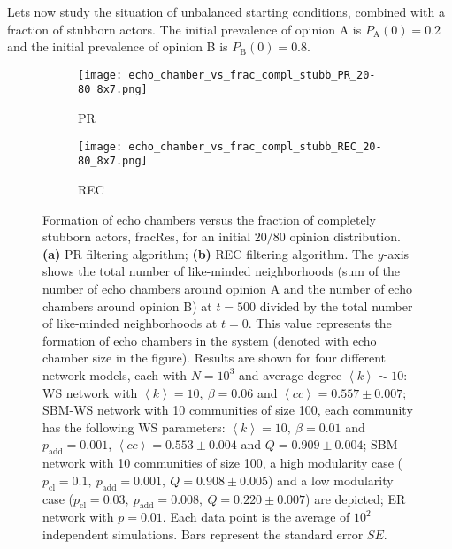 \documentclass[11 pt , letterpaper , twoside , openright]{book}
\begin{document}
\newline
Lets now study the situation of unbalanced starting conditions, combined with a fraction of stubborn actors. The initial prevalence of opinion A is $P_\text{A}(0) = 0.2$ and the initial prevalence of opinion B is $P_\text{B}(0) = 0.8$.

\begin{figure}[H]
  \begin{subfigure}[b]{0.49\textwidth}
    \caption{PR}
  	\texttt{[image: echo\_chamber\_vs\_frac\_compl\_stubb\_PR\_20-80\_8x7.png]}
    \label{PR_frac_compl_stubb_20-80}
  \end{subfigure}
  \begin{subfigure}[b]{0.49\textwidth}
    \caption{REC}
  	\texttt{[image: echo\_chamber\_vs\_frac\_compl\_stubb\_REC\_20-80\_8x7.png]}
    \label{REC_frac_compl_stubb_20-80}
  \end{subfigure}
  \captionsetup{format=plain}
  \caption[Formation of echo chambers versus fraction of completely stubborn actors for the PR and REC filtering algorithms and an initial $20/80$ opinion distribution.]{Formation of echo chambers versus the fraction of completely stubborn actors, fracRes, for an initial $20/80$ opinion distribution. \textbf{(a)} PR filtering algorithm; \textbf{(b)} REC filtering algorithm. The $y$-axis shows the total number of like-minded neighborhoods (sum of the number of echo chambers around opinion A and the number of echo chambers around opinion B) at $t=500$ divided by the total number of like-minded neighborhoods at $t=0$. This value represents the formation of echo chambers in the system (denoted with echo chamber size in the figure). Results are shown for four different network models, each with $N=10^3$ and average degree $\left<k\right> \sim 10$: WS network with $\left<k\right> =10,\ \beta = 0.06$ and $\left<cc\right> = 0.557 \pm 0.007$; SBM-WS network with 10 communities of size 100, each community has the following WS parameters: $\left<k\right> = 10,\ \beta = 0.01$ and $p_{\text{add}} = 0.001$, $\left<cc\right> = 0.553 \pm 0.004$ and $Q = 0.909 \pm 0.004$; SBM network with 10 communities of size 100, a high modularity case ($p_{\text{cl}} = 0.1,\ p_{\text{add}} = 0.001,\ Q = 0.908 \pm 0.005$) and a low modularity case ($p_{\text{cl}} = 0.03,\ p_{\text{add}} = 0.008,\ Q = 0.220 \pm 0.007$) are depicted; ER network with $p= 0.01$. Each data point is the average of $10^2$ independent simulations. Bars represent the standard error $SE$.}
\label{echo_vs_frac_complStubb_PR-REC_20-80}
\end{figure}
\end{document}
